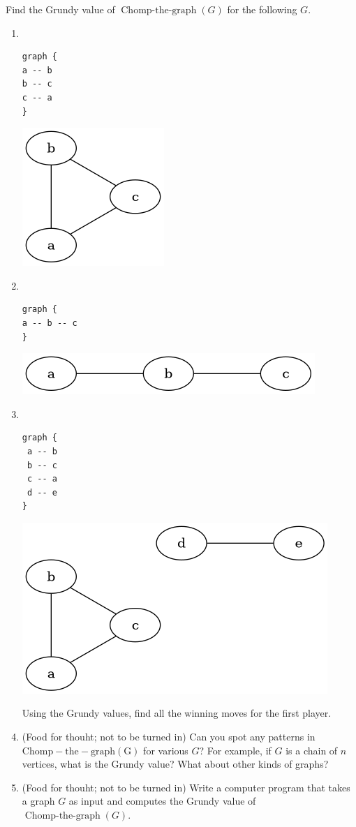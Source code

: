 \documentclass{amsart}
\begin{document}
Find the Grundy value of \(\operatorname{Chomp-the-graph}(G)\) for the following \(G\).
\begin{enumerate}
\item \mbox{}\\
\begin{verbatim}
graph {
a -- b
b -- c
c -- a
}
\end{verbatim}
\begin{center}
\includegraphics[width=.2 \textwidth]{hw10-triangle.png}
\label{org00cca4b}
\end{center}

\item \mbox{}\\
\begin{verbatim}
graph {
a -- b -- c
}
\end{verbatim}
\begin{center}
\includegraphics[width=.4 \textwidth]{hw10-chain.png}
\label{org23586f0}
\end{center}

\item \mbox{}\\
\begin{verbatim}
graph {
 a -- b
 b -- c
 c -- a
 d -- e
}
\end{verbatim}
\begin{center}
\includegraphics[width=.4 \textwidth]{hw10-union.png}
\label{org3285f4e}
\end{center}

Using the Grundy values, find all the winning moves for the first player.

\item (Food for thouht; not to be turned in)  Can you spot any patterns in \(\operatorname{Chomp-the-graph(G)}\) for various \(G\)?
For example, if \(G\) is a chain of \(n\) vertices, what is the Grundy value?
What about other kinds of graphs?

\item (Food for thouht; not to be turned in) Write a computer program that takes a graph \(G\) as input and computes the Grundy value of \(\operatorname{Chomp-the-graph}(G)\).
\end{enumerate}
\end{document}
